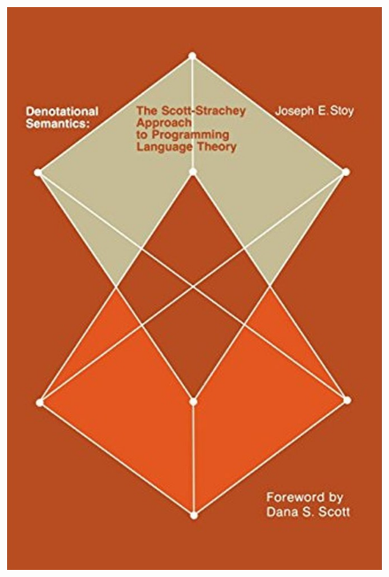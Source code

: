 \documentclass[pdf]{beamer}
\begin{document}
\begin{frame}
\begin{itemize}
\begin{figure}[!tbp]
\begin{minipage}[b]{0.15\textwidth}
        \includegraphics[width=\textwidth]{libro-stoy.jpg}
      \end{minipage}
    \end{figure}
  \end{itemize}
\end{frame}
\end{document}
